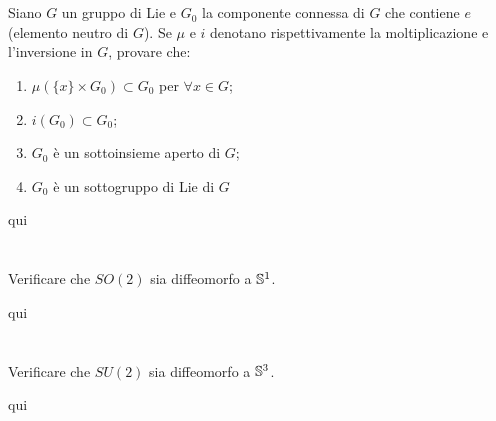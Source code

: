\section{}\label{es3-6}

\begin{tcolorbox}
	Siano $ G $ un gruppo di Lie e $ G_{0} $ la componente connessa di $ G $ che contiene $ e $ (elemento neutro di $ G $). Se $ \mu $ e $ i $ denotano rispettivamente la moltiplicazione e l'inversione in $ G $, provare che:
	
	\begin{enumerate}
		\item $ \mu(\{x\} \times G_{0}) \subset G_{0} $ per $ \forall x \in G $;
		
		\item $ i(G_{0}) \subset G_{0} $;
		
		\item $ G_{0} $ è un sottoinsieme aperto di $ G $;
		
		\item $ G_{0} $ è un sottogruppo di Lie di $ G $
	\end{enumerate}
\end{tcolorbox}

qui

%

\newpage

%

\section{}\label{BONUS3-1}

\begin{tcolorbox}
	Verificare che $ SO(2) $ sia diffeomorfo a $ \S^{1} $.
\end{tcolorbox}

qui

%

\newpage

%

\section{}\label{BONUS3-2}

\begin{tcolorbox}
	Verificare che $ SU(2) $ sia diffeomorfo a $ \S^{3} $.
\end{tcolorbox}

qui

%

\newpage

